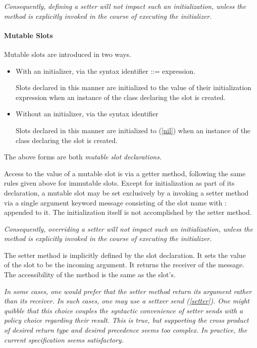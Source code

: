 \documentclass{article}
\newcommand{\code}[1]{{\sf #1}}
\begin{document}
{\it
Consequently, defining a setter will not impact such an initialization, unless the method is explicitly invoked in the course of executing the initializer.
}


\paragraph{Mutable Slots}
\label{mutableSlots}

Mutable slots are introduced in two ways.
\begin{itemize}
\item
With an initializer,  via the syntax \code{identifier ::= expression.}
%

Slots declared in this manner are initialized to the value of their initialization expression when an instance of the class declaring the slot is created.
\item
Without an initializer, via the syntax \code{identifier}

Slots declared in this manner are initialized to \NIL{ } (\ref{nil}) when an instance of the class declaring the slot is created.
\end{itemize}

The above forms are both {\em mutable slot declarations.}

Access to the value of a mutable slot is via a getter method,  following the same rules given above for immutable slots.  Except for initialization as part of its declaration, a mutable slot may be set exclusively by a invoking a setter method via a single argument keyword message consisting of the slot name with : appended to it.   The initialization itself is not accomplished by the setter method.

{\it
Consequently, overriding a setter will not impact such an initialization, unless the method is explicitly invoked in the course of executing the initializer.
}

The setter method is implicitly defined by the slot declaration. It sets the value of the slot to be the incoming argument. It returns the receiver of the message. The accessibility of the method is the same as the slot's.



{\it 
In some cases, one would prefer that the setter method return its argument rather than its receiver.
In such cases, one may use a settxer send (\ref{setter}). One might quibble that this choice couples the syntactic convenience of setter sends with a policy choice regarding their result. This is true, but supporting the cross product of desired return type and desired precedence seems too complex. In practice, the current specification seems satisfactory.
}
\end{document}

